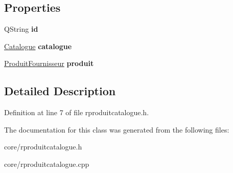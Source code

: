 \subsection*{Properties}
\begin{DoxyCompactItemize}
\item 
\hypertarget{class_r_produit_catalogue_ae6854a229a8921b08e8d72b9189f5d97}{
QString {\bfseries id}}
\label{class_r_produit_catalogue_ae6854a229a8921b08e8d72b9189f5d97}

\item 
\hypertarget{class_r_produit_catalogue_a88487bc822cb20770b27a977ef39bbd4}{
\hyperlink{class_catalogue}{Catalogue} {\bfseries catalogue}}
\label{class_r_produit_catalogue_a88487bc822cb20770b27a977ef39bbd4}

\item 
\hypertarget{class_r_produit_catalogue_a79ada5bf195b8472f442c1fec761b4ab}{
\hyperlink{class_produit_fournisseur}{ProduitFournisseur} {\bfseries produit}}
\label{class_r_produit_catalogue_a79ada5bf195b8472f442c1fec761b4ab}

\end{DoxyCompactItemize}


\subsection{Detailed Description}


Definition at line 7 of file rproduitcatalogue.h.



The documentation for this class was generated from the following files:\begin{DoxyCompactItemize}
\item 
core/rproduitcatalogue.h\item 
core/rproduitcatalogue.cpp\end{DoxyCompactItemize}
